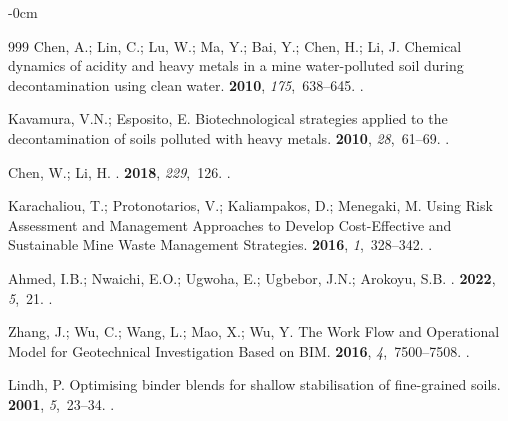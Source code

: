 \documentclass[algorithms,article,accept,pdftex,moreauthors]{Definitions/mdpi}
\begin{document}
\begin{adjustwidth}{-\extralength}{0cm}
\begin{thebibliography}{999}
Chen, A.; Lin, C.; Lu, W.; Ma, Y.; Bai, Y.; Chen, H.; Li, J.
\newblock Chemical dynamics of acidity and heavy metals in a mine
  water-polluted soil during decontamination using clean water.
 {\bf 2010}, {\em 175},~638--645.
.

Kavamura, V.N.; Esposito, E.
\newblock Biotechnological strategies applied to the decontamination of soils
  polluted with heavy metals.
 {\bf 2010}, {\em 28},~61--69.
.

Chen, W.; Li, H.
.
 {\bf 2018}, {\em
  229},~126.
.

Karachaliou, T.; Protonotarios, V.; Kaliampakos, D.; Menegaki, M.
\newblock Using Risk Assessment and Management Approaches to Develop
  Cost-Effective and Sustainable Mine Waste Management Strategies.
 {\bf 2016}, {\em 1},~328--342.
.

Ahmed, I.B.; Nwaichi, E.O.; Ugwoha, E.; Ugbebor, J.N.; Arokoyu, S.B.
.
 {\bf 2022}, {\em 5},~21.
.

Zhang, J.; Wu, C.; Wang, L.; Mao, X.; Wu, Y.
\newblock The Work Flow and Operational Model for Geotechnical Investigation
  Based on BIM.
 {\bf 2016}, {\em 4},~7500--7508.
.

Lindh, P.
\newblock Optimising binder blends for shallow stabilisation of fine-grained
  soils.
 {\bf 2001}, {\em 5},~23--34.
.


\end{thebibliography}
\end{adjustwidth}
\end{document}
